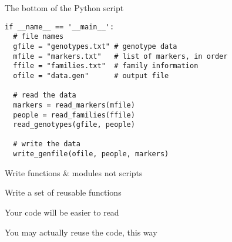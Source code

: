 \documentclass[12pt,t]{beamer}
\begin{document}
\begin{frame}[fragile]{The bottom of the Python script}

\vspace{18pt}

\begin{lstlisting}
if __name__ == '__main__':
  # file names
  gfile = "genotypes.txt" # genotype data
  mfile = "markers.txt"   # list of markers, in order
  ffile = "families.txt"  # family information
  ofile = "data.gen"      # output file

  # read the data
  markers = read_markers(mfile)
  people = read_families(ffile)
  read_genotypes(gfile, people)

  # write the data
  write_genfile(ofile, people, markers)
\end{lstlisting}

\end{frame}


\begin{frame}{Write functions \& modules not scripts}

\bbi
\item Write a set of reusable functions
\item Your code will be easier to read
\item You may actually reuse the code, this way
\ei

\end{frame}
\end{document}
